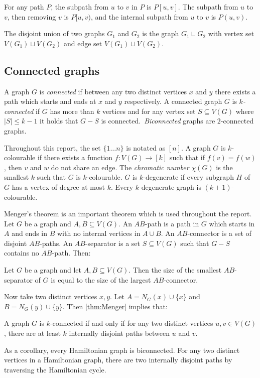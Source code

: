 For any path $P$, the subpath from $u$ to $v$ in $P$ is $P[u, v]$. The subpath from $u$ to $v$, then removing $v$ is $P[u, v)$, and the internal subpath from $u$ to $v$ is $P(u, v)$. 

The disjoint union of two graphs $G_1$ and $G_2$ is the graph $G_1 \sqcup G_2$ with vertex set $V(G_1) \sqcup V(G_2)$ and edge set $V(G_1) \sqcup V(G_2)$. 

\subsection{Connected graphs}
A graph $G$ is \textit{connected} if between any two distinct vertices $x$ and $y$ there exists a path which starts and ends at $x$ and $y$ respectively. 
A connected graph \(G\) is \textit{\(k\)-connected} if \(G\) has more than \(k\) vertices and for any vertex set $S \subseteq V(G)$ where $|S| \leq k - 1$ it holds that $G - S$ is connected.\ \textit{Biconnected} graphs are $2$-connected graphs. 

Throughout this report, the set $\lbrace 1\ldots n \rbrace$ is notated as $[n]$. 
A graph \(G\) is \(k\)-colourable if there exists a function \(f: V(G) \rightarrow [k]\) such that if $f(v) = f(w)$, then $v$ and $w$ do not share an edge. The \textit{chromatic number} \(\chi(G)\) is the smallest \(k\) such that \(G\) is \(k\)-colourable.
$G$ is $k$-degenerate if every subgraph $H$ of $G$ has a vertex of degree at most $k$. Every $k$-degenerate graph is $(k + 1)$-colourable. 

Menger's theorem \cite{mengerZurAllgemeinenKurventheorie1927} is an important theorem which is used throughout the report.
Let \(G\) be a graph and \(A, B \subseteq V(G)\). An \(AB\)-path is a path in \(G\) which starts in \(A\) and ends in \(B\) with no internal vertices in \(A \cup B\). An \(AB\)-connector is a set of disjoint \(AB\)-paths. An \(AB\)-separator is a set \(S \subseteq V(G)\) such that \(G - S\) contains no \(AB\)-path. Then:
\begin{theorem}\label{thm:Menger}
	Let $G$ be a graph and let $A, B \subseteq V(G)$. Then the size of the smallest \(AB\)-separator of \(G\) is equal to the size of the largest \(AB\)-connector.
\end{theorem}
Now take two distinct vertices \(x, y\). Let \(A = N_G(x) \cup \{x\} \) and \(B = N_G(y) \cup \{y\} \). Then \cref{thm:Menger} implies that:
\begin{theorem}\label{thm:Menger_Vertex}
	A graph \(G\) is \(k\)-connected if and only if for any two distinct vertices $u,v \in V(G)$, there are at least \(k\) internally disjoint paths between $u$ and $v$.
\end{theorem}
As a corollary, every Hamiltonian graph is biconnected. For any two distinct vertices in a Hamiltonian graph, there are two internally disjoint paths by traversing the Hamiltonian cycle.
